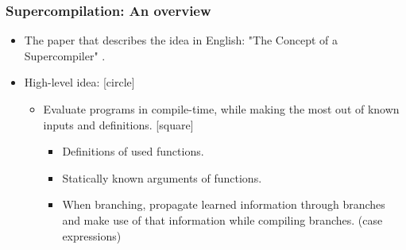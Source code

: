 \documentclass{beamer}
\begin{document}
\begin{frame}

    \frametitle{Supercompilation: An overview}

    \begin{itemize}[<+->]
        \item
            The paper that describes the idea in English: "The Concept of a
            Supercompiler" \citet{Turchin86theconcept}.
        \item
            High-level idea:
            [circle]
            \begin{itemize}
                \item
                    Evaluate programs in compile-time, while making the most out
                    of known inputs and definitions.
                    [square]
                    \begin{itemize}
                        \item
                            Definitions of used functions.
                        \item
                            Statically known arguments of functions.
                        \item
                            When branching, propagate learned information
                            through branches and make use of that information
                            while compiling branches. (case expressions)
                    \end{itemize}
            \end{itemize}
    \end{itemize}

\end{frame}
\end{document}
